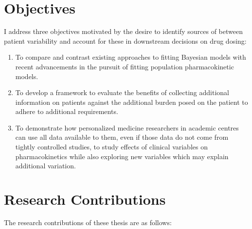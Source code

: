 

\section{Objectives}

I address three objectives motivated by the desire to identify sources of between patient variability and account for these in downstream decisions on drug dosing:

\begin{enumerate}[1)]
	\item To compare and contrast existing approaches to fitting Bayesian models with recent advancements in the pursuit of fitting population pharmacokinetic models. 
	
	\item To develop a framework to evaluate the  benefits of collecting additional information on patients against the additional burden posed on the patient to adhere to additional requirements. 
	
	\item To demonstrate how personalized medicine researchers in academic centres can use all data available to them, even if those data do not come from tightly controlled studies, to study effects of clinical variables on pharmacokinetics while also exploring new variables which may explain additional variation.
\end{enumerate}


\section{Research Contributions}

The research contributions of these thesis are as follows:

